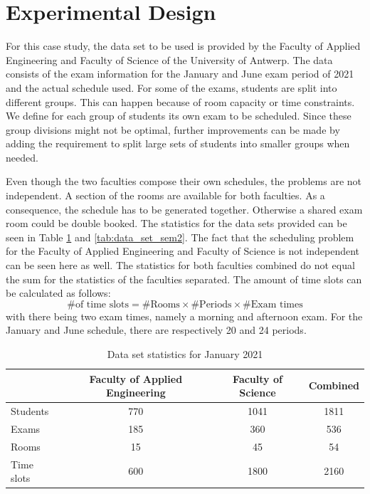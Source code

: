 \section{Experimental Design}\label{sec:experiment}

For this case study, the data set to be used is provided by the Faculty of Applied Engineering and Faculty of Science of the University of Antwerp. The data consists of the exam information for the January and June exam period of 2021 and the actual schedule used. For some of the exams, students are split into different groups. This can happen because of room capacity or time constraints. We define for each group of students its own exam to be scheduled. Since these group divisions might not be optimal, further improvements can be made by adding the requirement to split large sets of students into smaller groups when needed.

Even though the two faculties compose their own schedules, the problems are not independent. A section of the rooms are available for both faculties. As a consequence, the schedule has to be generated together. Otherwise a shared exam room could be double booked. The statistics for the data sets provided can be seen in Table \ref{tab:data_set_sem1} and \ref{tab:data_set_sem2}. The fact that the scheduling problem for the Faculty of Applied Engineering and Faculty of Science is not independent can be seen here as well. The statistics for both faculties combined do not equal the sum for the statistics of the faculties separated. The amount of time slots can be calculated as follows:
\begin{equation}
    \text{\# of time slots} = \text{\# Rooms} \times \text{\# Periods} \times \text{\# Exam times}  
\end{equation}
with there being two exam times, namely a morning and afternoon exam. For the January and June schedule, there are respectively 20 and 24 periods.
\begin{table}[H]
	\caption{Data set statistics for January 2021}
	\label{tab:data_set_sem1}
	\centering
	\begin{tabular}{l c c c }
		\hline
		& \textbf{Faculty of Applied Engineering} & \textbf{Faculty of Science} & \textbf{Combined} \\ \hline
		Students & 770 & 1041 & 1811 \\
		Exams & 185 & 360 & 536 \\
	    Rooms & 15 & 45 & 54 \\
        Time slots & 600 & 1800 & 2160 \\ \hline
	\end{tabular}
\end{table}

